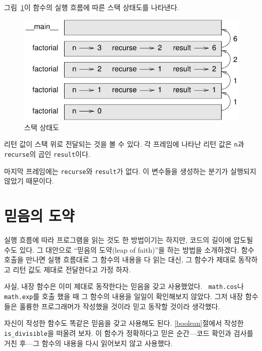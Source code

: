 \documentclass[10pt]{book}
\begin{document}

그림~\ref{fig.stack3}이 함수의 실행 흐름에 따른 스택 상태도를 나타낸다. 

\begin{figure}
\centerline
{\includegraphics[scale=0.8]{figs/stack3.pdf}}
\caption{스택 상태도}
\label{fig.stack3}
\end{figure}

리턴 값이 스택 위로 전달되는 것을 볼 수 있다.  각 프레임에 나타난 리턴
값은 {\tt n}과 {\tt recurse}의 곱인 {\tt result}이다.

마지막 프레임에는 {\tt recurse}와 {\tt result}가 없다.  이 변수들을
생성하는 분기가 실행되지 않았기 때문이다.



\section{믿음의 도약}

실행 흐름에 따라 프로그램을 읽는 것도 한 방법이기는 하지만, 코드의
길이에 압도될 수도 있다.  그 대안으로 ``믿음의 도약(leap of faith)''을
하는 방법을 소개하겠다.  함수 호출을 만나면 실행 흐름대로 그 함수의
내용을 다 읽는 대신, 그 함수가 제대로 동작하고 리턴 값도 제대로
전달한다고 가정 하자.

사실, 내장 함수은 이미 제대로 동작한다는 믿음을 갖고 사용했었다.  {\tt
  math.cos}나 {\tt math.exp}를 호출 했을 때 그 함수의 내용을 일일이
확인해보지 않았다. 그저 내장 함수들은 훌륭한 프로그래머가 작성했을
것이라 믿고 동작할 것이라 생각했다.

자신이 작성한 함수도 똑같은 믿음을 갖고 사용해도 된다.
\ref{boolean}절에서 작성한 \verb"is_divisible"을 떠올려 보자.  이
함수가 정확하다고 믿은 순간---코드 확인과 검사를 거친 후---그 함수의
내용을 다시 읽어보지 않고 사용했다.
\end{document}
